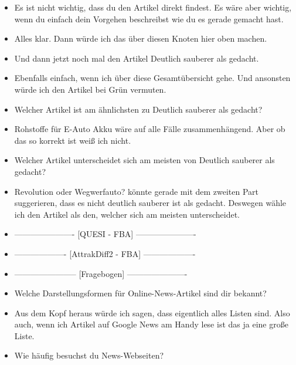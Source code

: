 {\begin{itemize}[]
                  Aber ist in diesem Test gefordert, dass ich den Artikel direkt finden muss?
                  Weil dann würde ich einfach oben auf den Knoten mit der 13 klicken.
            \item {} Es ist nicht wichtig, dass du den Artikel direkt findest.
                  Es wäre aber wichtig, wenn du einfach dein Vorgehen beschreibst wie du es gerade gemacht hast.
            \item {} Alles klar. Dann würde ich das über diesen Knoten hier oben machen.
            \item {} Und dann jetzt noch mal den Artikel \flqq Deutlich sauberer als gedacht\frqq{}.
            \item {} Ebenfalls einfach, wenn ich über diese Gesamtübersicht gehe.
                  Und ansonsten würde ich den Artikel bei Grün vermuten.
            \item {} Welcher Artikel ist am ähnlichsten zu \flqq Deutlich sauberer als gedacht\frqq{}?
            \item {} \flqq Rohstoffe für E-Auto Akku\frqq{} wäre auf alle Fälle zusammenhängend.
                  Aber ob das so korrekt ist weiß ich nicht.
            \item {} Welcher Artikel unterscheidet sich am meisten von \flqq Deutlich sauberer als gedacht\frqq{}?
            \item {} \flqq Revolution oder Wegwerfauto?\frqq{} könnte gerade mit dem zweiten Part suggerieren, dass es nicht deutlich sauberer ist als gedacht.
                  Deswegen wähle ich den Artikel als den, welcher sich am meisten unterscheidet.
            \item {----------------------} [QUESI - FBA] {----------------------}
            \item {-------------------} [AttrakDiff2 - FBA] {-------------------}
            \item {-----------------------} [Fragebogen] {----------------------}
            \item {} Welche Darstellungsformen für Online-News-Artikel sind dir bekannt?
            \item {} Aus dem Kopf heraus würde ich sagen, dass eigentlich alles Listen sind.
                  Also auch, wenn ich Artikel auf Google News am Handy lese ist das ja eine große Liste.
            \item {} Wie häufig besuchst du News-Webseiten?

\end{itemize}}
